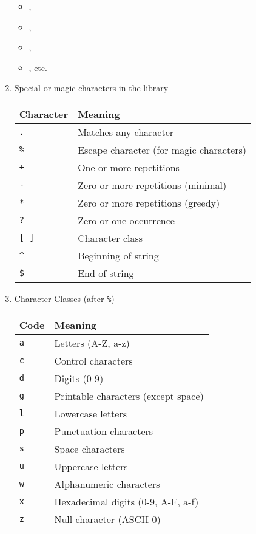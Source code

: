 \begin{enumerate}[label=(\alph*)]
\begin{itemize}
\item {},

\item {},

\item {},

\item {}, etc.
\end{itemize}

\item Special or magic characters in the library \\

\begin{center}
  \begin{tabular}{@{}ll@{}}
  \toprule
  \textbf{Character} & \textbf{Meaning} \\
  \midrule
  \texttt{.} & Matches any character \\
  \texttt{\%} & Escape character (for magic characters) \\
  \texttt{+} & One or more repetitions \\
  \texttt{-} & Zero or more repetitions (minimal) \\
  \texttt{*} & Zero or more repetitions (greedy) \\
  \texttt{?} & Zero or one occurrence \\
  \texttt{[ ]} & Character class \\
  \texttt{\^{}} & Beginning of string \\
  \texttt{\$} & End of string \\
  \bottomrule
  \end{tabular}
\end{center}

\item Character Classes (after \texttt{\%})

\begin{center}
  \begin{tabular}{@{}ll@{}}
  \toprule
  \textbf{Code} & \textbf{Meaning} \\
  \midrule
  \texttt{a} & Letters (A-Z, a-z) \\
  \texttt{c} & Control characters \\
  \texttt{d} & Digits (0-9) \\
  \texttt{g} & Printable characters (except space) \\
  \texttt{l} & Lowercase letters \\
  \texttt{p} & Punctuation characters \\
  \texttt{s} & Space characters \\
  \texttt{u} & Uppercase letters \\
  \texttt{w} & Alphanumeric characters \\
  \texttt{x} & Hexadecimal digits (0-9, A-F, a-f) \\
  \texttt{z} & Null character (ASCII 0) \\
  \bottomrule
  \end{tabular}
\end{center}


\end{enumerate}
